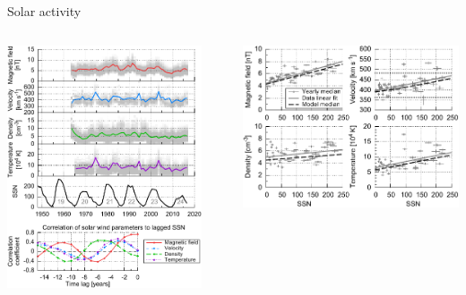 \begin{frame}[c]{Solar activity}{}
	\begin{columns}[c]
		
		\includegraphics[width=0.9\textwidth]{../figures_paper/OMNI_yearly_ssn_correlation_c_plot.pdf}

		
		\includegraphics[width=\textwidth]{../figures_paper/OMNI_yearly_BVNTvsSSN_a.pdf}
		
	\end{columns}
\end{frame}
